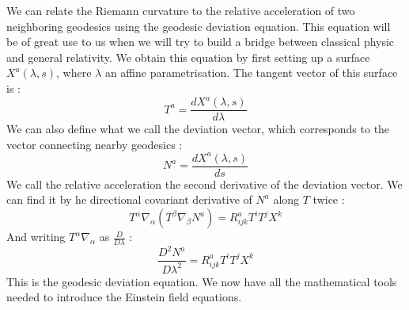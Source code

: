 \documentclass[a4paper,12pt]{article}
\theoremstyle{definition}
\begin{document}
We can relate the Riemann curvature to the relative acceleration of two neighboring geodesics using the geodesic deviation equation.
This equation will be of great use to us when we will try to build a bridge between classical physic and general relativity.
We obtain this equation by first setting up a surface $X^a(\lambda,s)$, where $\lambda$ an affine parametrisation.
The tangent vector of this surface is :
\begin{equation}
	T^a=\frac{dX^a(\lambda,s)}{d\lambda}
\end{equation}
We can also define what we call the deviation vector, which corresponds to the vector connecting nearby geodesics :
\begin{equation}
	N^a=\frac{dX^a(\lambda,s)}{ds}
\end{equation}
We call the relative acceleration the second derivative of the deviation vector.
We can find it by he directional covariant derivative of $N^a$ along $T$ twice :
\begin{equation}
	T^\alpha\nabla_\alpha(T^\beta\nabla_\beta N^a)=R^a_{ijk}T^iT^jX^k
\end{equation}
And writing $T^\alpha\nabla_\alpha$ as $\frac{D}{D\lambda}$ :
\begin{equation}\label{Dev_Equ}
	\frac{D^2N^a}{D\lambda^2}=R^a_{ijk}T^iT^jX^k
\end{equation}
This is the  geodesic deviation equation.
We now have all the mathematical tools needed to introduce the Einstein field equations.
\end{document}
